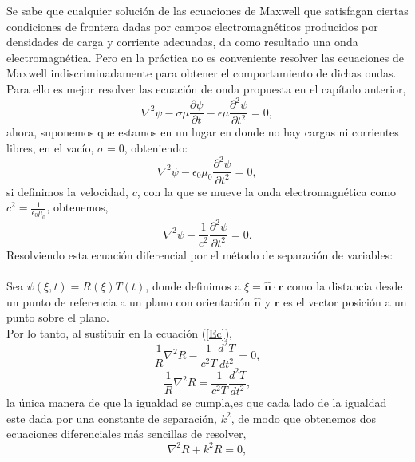 \documentclass[11pt,fleqn]{book} %
\begin{document}
Se sabe que cualquier soluci\'on de las ecuaciones de Maxwell que satisfagan ciertas condiciones de frontera dadas por campos electromagn\'eticos producidos por densidades de
carga y corriente adecuadas, da como resultado una onda electromagn\'etica. Pero en la pr\'actica no es conveniente resolver las ecuaciones de Maxwell indiscriminadamente para
obtener el comportamiento de dichas ondas.\\
Para ello es mejor resolver las ecuaci\'on de onda propuesta en el cap\'itulo anterior,
\begin{equation}\label{EcOndaCom}
 \nabla^2 \psi-\sigma\mu\frac{\partial \psi}{\partial t}-\epsilon\mu\frac{\partial^2 \psi}{\partial t^2}=0,
\end{equation}
ahora, suponemos que estamos en un lugar en donde no hay cargas ni corrientes libres, en el vac\'io, $\sigma=0$, obteniendo:
\begin{equation*}
 \nabla^2 \psi-\epsilon_0\mu_0\frac{\partial^2 \psi}{\partial t^2}=0,
\end{equation*}
si definimos la velocidad, $c$, con la que se mueve la onda electromagn\'etica como $c^2=\frac{1}{\epsilon_0\mu_0}$, obtenemos,
\begin{equation}
 \nabla^2 \psi-\frac{1}{c^2}\frac{\partial^2 \psi}{\partial t^2}=0. \label{Ec}
\end{equation}
Resolviendo esta ecuaci\'on diferencial por el m\'etodo de separaci\'on de variables: \\\\
Sea $\psi(\xi,t)=R(\xi)T(t)$, donde definimos a $\xi=\hat{\textbf{n}}\cdot \textbf{r}$
como la distancia desde un punto de referencia a un plano con orientaci\'on $\hat{\textbf{n}}$ y $\textbf{r}$ es el vector posici\'on a un punto sobre el plano.\\
Por lo tanto, al sustituir en la ecuaci\'on (\ref{Ec}),
\begin{equation*}
\frac{1}{R} \nabla^2 R-\frac{1}{c^2T}\frac{d^2 T}{d t^2}=0,
\end{equation*}
\begin{equation*}
\frac{1}{R} \nabla^2 R=\frac{1}{c^2T}\frac{d^2 T}{d t^2} ,
\end{equation*}
la \'unica manera de que la igualdad se cumpla,es que cada lado de la igualdad este dada por una constante de separaci\'on, $k^2$, de modo que obtenemos dos ecuaciones diferenciales m\'as sencillas de resolver,
\begin{equation} \label{EcR}
\nabla^2 R+k^2R=0,
\end{equation}
\end{document}
